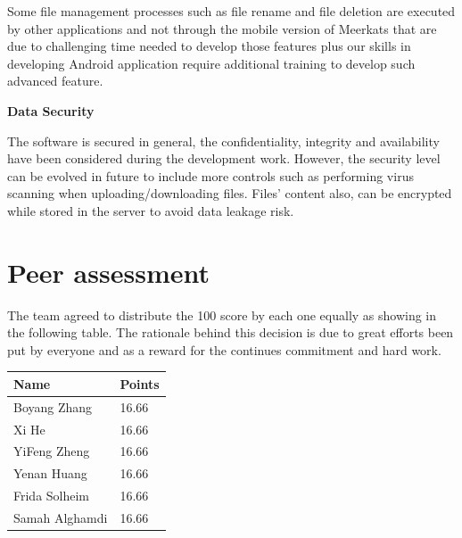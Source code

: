 \documentclass{article}
\begin{document}
Some file management processes such as file rename and file deletion are executed by other applications and not through the mobile version of Meerkats that are due to challenging time needed to develop those features plus our skills in developing Android application require additional training to develop such advanced feature.


\textbf{Data Security}

The software is secured in general, the confidentiality, integrity and availability have been considered during the development work. However, the security level can be evolved in future to include more controls such as performing virus scanning when uploading/downloading files. Files’ content also, can be encrypted while stored in the server to avoid data leakage risk.

\section{Peer assessment}
The team agreed to distribute the 100 score by each one equally as showing in the following table. The rationale behind this decision is due to great efforts been put by everyone and as a reward for the continues commitment and hard work.


\begin{center}
\begin{tabular}{ | m{3cm}| m{1.3cm} | }
\hline
\textbf{Name} & \textbf{Points}  \\
\hline
Boyang Zhang & 16.66  \\
\hline
Xi He & 16.66  \\
\hline
YiFeng Zheng & 16.66 \\
\hline
Yenan Huang & 16.66 \\
\hline
Frida Solheim & 16.66 \\
\hline
Samah Alghamdi & 16.66 \\
\hline
\end{tabular}
\end{center}
\end{document}
